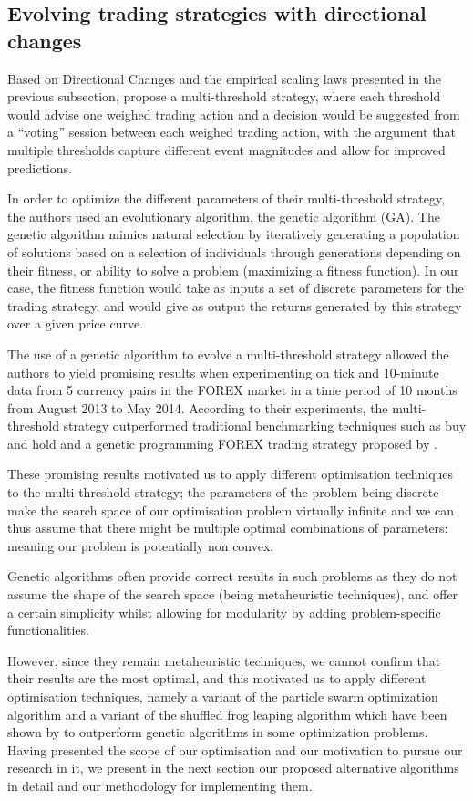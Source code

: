 \documentclass[conference]{IEEEtran}
\begin{document}
\subsection{Evolving trading strategies with directional changes}

Based on Directional Changes and the empirical scaling laws presented in the previous subsection, \cite{kampouridis_otero_dc_ga} propose a multi-threshold strategy, where each threshold would advise one weighed trading action and a decision would be suggested from a “voting” session between each weighed trading action, with the argument that multiple thresholds capture different event magnitudes and allow for improved predictions.

In order to optimize the different parameters of their multi-threshold strategy, the authors used an evolutionary algorithm, the genetic algorithm (GA). The genetic algorithm mimics natural selection by iteratively generating a population of solutions based on a selection of individuals through generations depending on their fitness, or ability to solve a problem (maximizing a fitness function). In our case, the fitness function would take as inputs a set of discrete parameters for the trading strategy, and would give as output the returns generated by this strategy over a given price curve.

The use of a genetic algorithm to evolve a multi-threshold strategy allowed the authors to yield promising results when experimenting on tick and 10-minute data from 5 currency pairs in the FOREX market in a time period of 10 months from August 2013 to May 2014. According to their experiments, the multi-threshold strategy outperformed traditional benchmarking techniques such as buy and hold and a genetic programming FOREX trading strategy proposed by \cite{eddie}. 

These promising results motivated us to apply different optimisation techniques to the multi-threshold strategy; the parameters of the problem being discrete make the search space of our optimisation problem virtually infinite and we can thus assume that there might be multiple optimal combinations of parameters: meaning our problem is potentially non convex.

Genetic algorithms often provide correct results in such problems as they do not assume the shape of the search space (being metaheuristic techniques), and offer a certain simplicity whilst allowing for modularity by adding problem-specific functionalities.

However, since they remain metaheuristic techniques, we cannot confirm that their results are the most optimal, and this motivated us to apply different optimisation techniques, namely a variant of the particle swarm optimization algorithm and a variant of the shuffled frog leaping algorithm which have been shown by \cite{evo_algos_comparison} to outperform genetic algorithms in some optimization problems. Having presented the scope of our optimisation and our motivation to pursue our research in it, we present in the next section our proposed alternative algorithms in detail and our methodology for implementing them.
\end{document}
